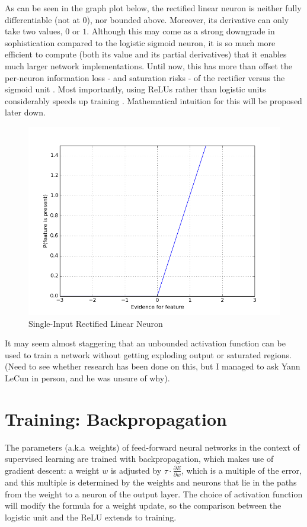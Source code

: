 \documentclass[a4paper,11pt]{article}
\begin{document}
As can be seen in the graph plot below, the rectified linear neuron is neither fully differentiable (not at $0$), nor bounded above. Moreover, its derivative can only take two values, $0$ or $1$. Although this may come as a strong downgrade in sophistication compared to the logistic sigmoid neuron, it is so much more efficient to compute (both its value and its partial derivatives) that it enables much larger network implementations\cite{krizhevsky}. Until now, this has more than offset the per-neuron information loss - and saturation risks - of the rectifier versus the sigmoid unit \cite{rectifier}. Most importantly, using ReLUs rather than logistic units considerably speeds up training \cite{krizhevsky}. Mathematical intuition for this will be proposed later down.

\begin{figure}[h!]
	\centering
	\includegraphics[scale=0.5]{images/ReLU.png}
	\caption{Single-Input Rectified Linear Neuron}
\end{figure}

It may seem almost staggering that an unbounded activation function can be used to train a network without getting exploding output or saturated regions. (Need to see whether research has been done on this, but I managed to ask Yann LeCun in person, and he was unsure of why).


\section{Training: Backpropagation}

The parameters (a.k.a\ weights) of feed-forward neural networks in the context of supervised learning are trained with backpropagation, which makes use of gradient descent: a weight $w$ is adjusted by $\tau \cdot \frac{\partial{E}}{\partial{w}}$, which is a multiple of the error, and this multiple is determined by the weights and neurons that lie in the paths from the weight to a neuron of the output layer. The choice of activation function will modify the formula for a weight update, so the comparison between the logistic unit and the ReLU extends to training.
\end{document}
